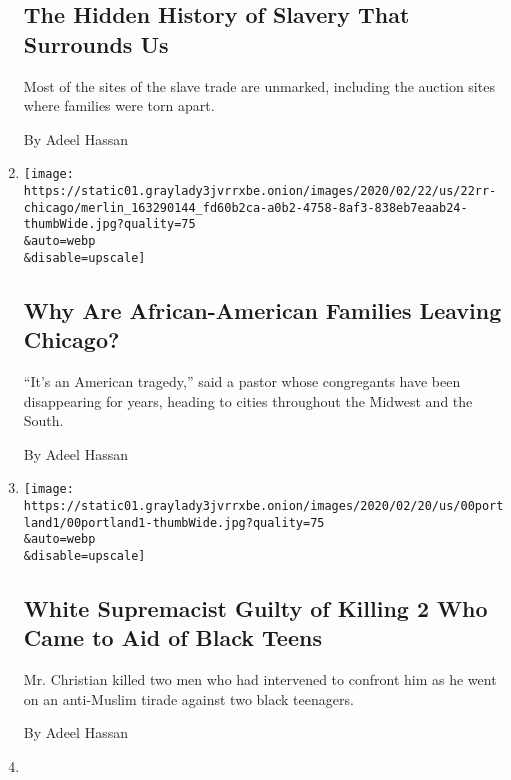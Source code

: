 \begin{enumerate}
  \hypertarget{the-hidden-history-of-slavery-that-surrounds-us}{%
  \subsection{The Hidden History of Slavery That Surrounds
  Us}\label{the-hidden-history-of-slavery-that-surrounds-us}}

  Most of the sites of the slave trade are unmarked, including the
  auction sites where families were torn apart.

  By Adeel Hassan
\item
  \href{/2020/02/22/us/why-are-african-american-families-leaving-chicago.html}{}

  \texttt{[image: https://static01.graylady3jvrrxbe.onion/images/2020/02/22/us/22rr-chicago/merlin\_163290144\_fd60b2ca-a0b2-4758-8af3-838eb7eaab24-thumbWide.jpg?quality=75\\\&auto=webp\\\&disable=upscale]}

  \hypertarget{why-are-african-american-families-leaving-chicago}{%
  \subsection{Why Are African-American Families Leaving
  Chicago?}\label{why-are-african-american-families-leaving-chicago}}

  ``It's an American tragedy,'' said a pastor whose congregants have
  been disappearing for years, heading to cities throughout the Midwest
  and the South.

  By Adeel Hassan
\item
  \href{/2020/02/21/us/white-supremacist-guilty-of-killing-2-who-came-to-aid-of-black-teens.html}{}

  \texttt{[image: https://static01.graylady3jvrrxbe.onion/images/2020/02/20/us/00portland1/00portland1-thumbWide.jpg?quality=75\\\&auto=webp\\\&disable=upscale]}

  \hypertarget{white-supremacist-guilty-of-killing-2-who-came-to-aid-of-black-teens}{%
  \subsection{White Supremacist Guilty of Killing 2 Who Came to Aid of
  Black
  Teens}\label{white-supremacist-guilty-of-killing-2-who-came-to-aid-of-black-teens}}

  Mr. Christian killed two men who had intervened to confront him as he
  went on an anti-Muslim tirade against two black teenagers.

  By Adeel Hassan
\item
  \href{/2020/02/15/us/how-andrew-yang-handled-his-asian-american-identity-on-the-campaign-trail.html}{}


\end{enumerate}

